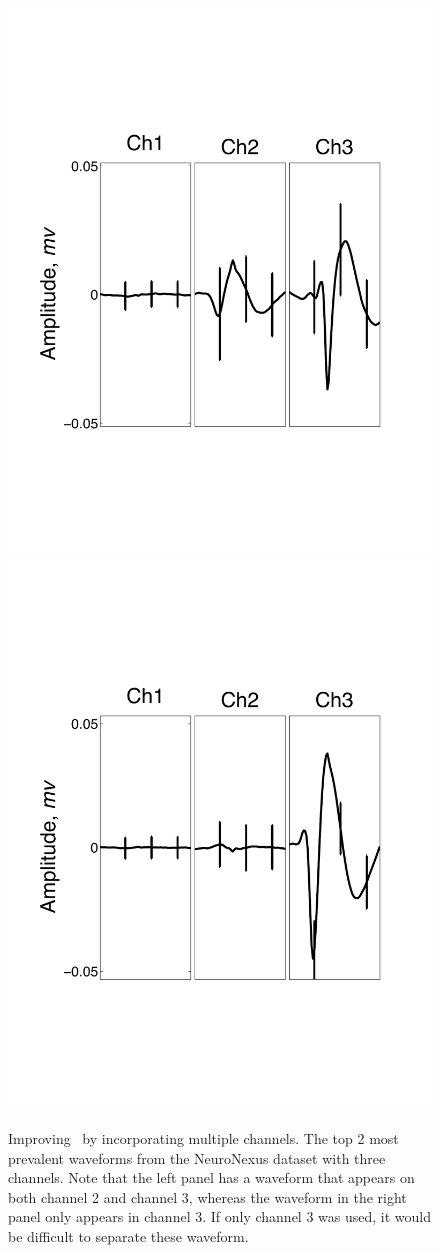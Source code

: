 \begin{center}
\begin{figure}
	\includegraphics[width=.3\textwidth]{../figs/3devim/clus1}
	\includegraphics[width=.3\textwidth]{../figs/3devim/clus2}
%
\caption{
Improving \smug\ by incorporating {multiple} channels.
The top 2 most prevalent waveforms from the NeuroNexus dataset with three channels.  Note that the left panel has a waveform that appears on both channel 2 and channel 3, whereas the waveform in the right panel  only appears in channel 3.  If only channel 3 was used, it would be difficult to separate these waveform.
} 
\end{figure} \label{ext31}
\end{center}
\vspace{-.1in}













